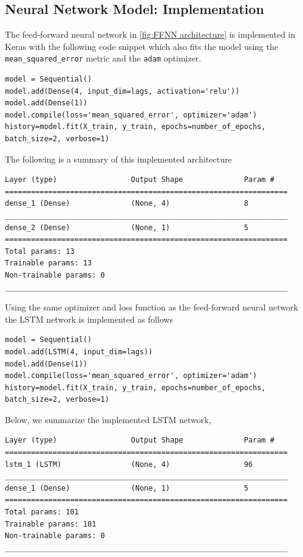 \documentclass[10pt,a4paper]{article}
\begin{document}
\subsection{Neural Network Model: Implementation}\label{section: Fitting NN}


The feed-forward neural network in \ref{fig:FFNN architecture} is implemented in Keras with the following code snippet which also fits the model using the \verb|mean_squared_error| metric and the \verb|adam| optimizer.
\begin{lstlisting}
model = Sequential()
model.add(Dense(4, input_dim=lags, activation='relu'))
model.add(Dense(1))
model.compile(loss='mean_squared_error', optimizer='adam')
history=model.fit(X_train, y_train, epochs=number_of_epochs, batch_size=2, verbose=1)
\end{lstlisting}
The following is a summary of this implemented architecture
\begin{lstlisting}
Layer (type)                 Output Shape              Param #   
=================================================================
dense_1 (Dense)              (None, 4)                 8         
_________________________________________________________________
dense_2 (Dense)              (None, 1)                 5         
=================================================================
Total params: 13
Trainable params: 13
Non-trainable params: 0
_________________________________________________________________
\end{lstlisting}

\newpage
Using the same optimizer and loss function as the feed-forward neural network the LSTM network is implemented as follows
\begin{lstlisting}
model = Sequential()
model.add(LSTM(4, input_dim=lags))
model.add(Dense(1))
model.compile(loss='mean_squared_error', optimizer='adam')
history=model.fit(X_train, y_train, epochs=number_of_epochs, batch_size=2, verbose=1)
\end{lstlisting}
Below, we summarize the implemented LSTM network,
\begin{lstlisting}
Layer (type)                 Output Shape              Param #   
=================================================================
lstm_1 (LSTM)                (None, 4)                 96        
_________________________________________________________________
dense_1 (Dense)              (None, 1)                 5         
=================================================================
Total params: 101
Trainable params: 101
Non-trainable params: 0
_________________________________________________________________
\end{lstlisting}
\end{document}
